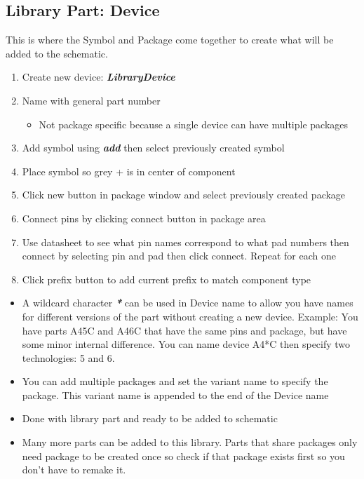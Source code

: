 \documentclass{article}
\begin{document}
\subsection{Library Part: Device}
This is where the Symbol and Package come together to create what will be added to the schematic.
\begin{enumerate}
    \item Create new device: \textit{\textbf{Library\textrightarrow Device}}
    \item Name with general part number
    \begin{itemize}
        \item Not package specific because a single device can have multiple packages
    \end{itemize}
    \item Add symbol using \textit{\textbf{add}} then select previously created symbol
    \item Place symbol so grey + is in center of component
    \item Click new button in package window and select previously created package
    \item Connect pins by clicking connect button in package area
    \item Use datasheet to see what pin names correspond to what pad numbers then connect by selecting pin and pad then click connect. Repeat for each one
    \item Click prefix button to add current prefix to match component type
\end{enumerate}
\begin{tcolorbox} [title=Tips \& Tricks]
    \begin{itemize}
        \item A wildcard character \textit{\textbf{*}} can be used in Device name to allow you have names for different versions of the part without creating a new device. Example: You have parts A45C and A46C that have the same pins and package, but have some minor internal difference. You can name device A4*C then specify two technologies: 5 and 6.
        \item You can add multiple packages and set the variant name to specify the package. This variant name is appended to the end of the Device name
    \end{itemize}
\end{tcolorbox}

\begin{itemize}
    \item Done with library part and ready to be added to schematic
    \item Many more parts can be added to this library. Parts that share packages only need package to be created once so check if that package exists first so you don't have to remake it.
\end{itemize}
\end{document}
